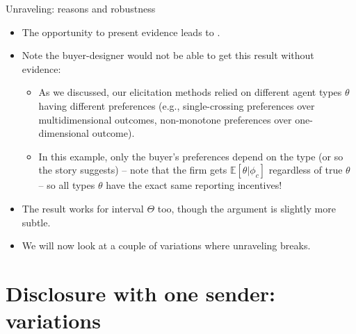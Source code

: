 \documentclass[english,10pt
,aspectratio=169
]{beamer}
\begin{document}
\begin{frame}{Unraveling: reasons and robustness}
	\begin{itemize}
		\item The opportunity to present evidence leads to .
		\item Note the buyer-designer would \alert{not be able} to get this result \alert{without evidence}:
		\begin{itemize}
			\item As we discussed, our elicitation methods relied on different agent types $\theta$ having different preferences (e.g., single-crossing preferences over multidimensional outcomes, non-monotone preferences over one-dimensional outcome).
			
			\item In this example, only the buyer's preferences depend on the type (or so the story suggests) -- note that the firm gets $\mathbb{E}[\theta | \phi_c]$ regardless of true $\theta$ -- so all types $\theta$ have the exact same reporting incentives! 
		\end{itemize}
		\pause
		\item The result works for interval $\Theta$ too, though the argument is slightly more subtle. 
		\item We will now look at a couple of variations where unraveling \alert{breaks}.
	\end{itemize}
\end{frame}


\section{Disclosure with one sender: variations}
\end{document}
